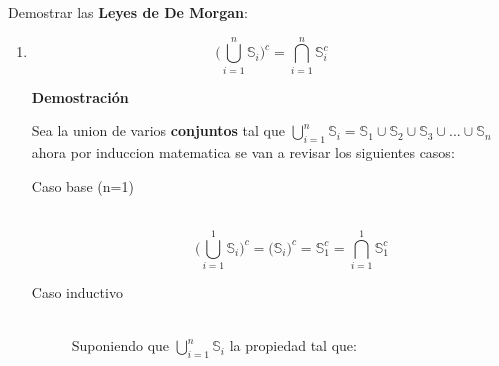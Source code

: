 \documentclass[a4paper,dvipsnames]{book}
\newcommand{\np}{\null\newpage}
\begin{document}
        \item Demostrar las \textbf{Leyes de De Morgan}:
            \begin{enumerate}
                \item \[\Big(\bigcup_{i=1}^{n}\mathbb S_{i}\Big)^{c} = \bigcap_{i=1}^{n}\mathbb S_{i}^{c}\]

                \textbf{Demostración}

                Sea la union de varios \textbf{conjuntos} tal que
                    $\bigcup_{i=1}^{n}\mathbb S_{i}=\mathbb S_{1}\cup\mathbb
                    S_{2}\cup\mathbb S_{3}\cup...\cup\mathbb S_{n}$ ahora por
                    induccion matematica se van a revisar los siguientes casos:

                    \begin{description}
                        \item[Caso base (n=1)]\\
                        \begin{equation*}

                        \Big(\bigcup_{i=1}^{1}\mathbb S_{i}\Big)^{c} =
                            \Big(\mathbb S_{i}\Big)^{c} = \mathbb
                            S_{1}^{c}=\bigcap_{i=1}^{1}\mathbb S_{1}^{c}
                        \end{equation*}
                        \np
                        \item[Caso inductivo]\\
                            Suponiendo que $\bigcup_{i=1}^{n}\mathbb S_{i}$ la propiedad tal que:
                            \begin{equation*}


\end{equation*}
\end{description}
\end{enumerate}
\end{document}
